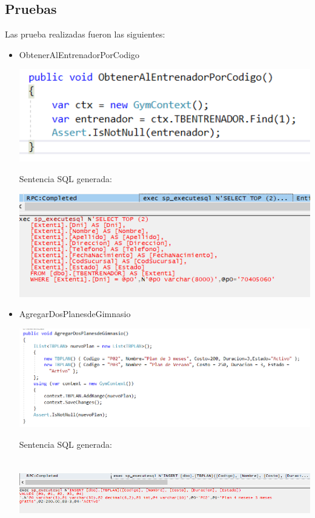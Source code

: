 \subsection{Pruebas}
Las prueba realizadas fueron las siguientes:
\begin{itemize}
	\item ObtenerAlEntrenadorPorCodigo 
\begin{center}
\includegraphics[width=15cm]{./Imagenes/prueba1.png}
\end{center}
Sentencia SQL generada:
\begin{center}
\includegraphics[width=15cm]{./Imagenes/profile1.png}
\end{center}
	\item AgregarDosPlanesdeGimnasio
\begin{center}
\includegraphics[width=15cm]{./Imagenes/prueba2.png}
\end{center}
Sentencia SQL generada:
\begin{center}
\includegraphics[width=17cm, height=3cm]{./Imagenes/profile2-1.png}

\end{center}
\end{itemize}
